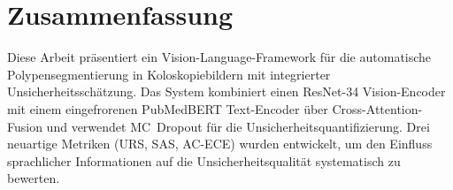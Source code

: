 
\chapter*{Zusammenfassung}

Diese Arbeit pr\"asentiert ein Vision-Language-Framework f\"ur die automatische Polypensegmentierung in Koloskopiebildern mit integrierter Unsicherheitssch\"atzung. Das System kombiniert einen ResNet-34 Vision-Encoder mit einem eingefrorenen PubMedBERT Text-Encoder \"uber Cross-Attention-Fusion und verwendet MC~Dropout f\"ur die Unsicherheitsquantifizierung. Drei neuartige Metriken (URS, SAS, AC-ECE) wurden entwickelt, um den Einfluss sprachlicher Informationen auf die Unsicherheitsqualit\"at systematisch zu bewerten.

